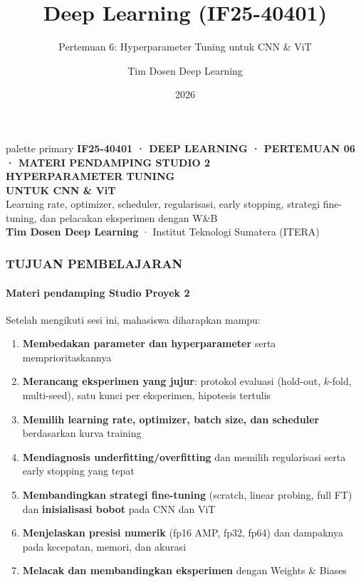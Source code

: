\documentclass[t,aspectratio=169,xcolor={dvipsnames,table}]{beamer}
\title[Pertemuan 6: Hyperparameter Tuning]{Deep Learning (IF25-40401)}
\subtitle{Pertemuan 6: Hyperparameter Tuning untuk CNN \& ViT}
\author{Tim Dosen Deep Learning}
\institute{Teknik Informatika — Institut Teknologi Sumatera (ITERA)}
\date{2026}
\begin{document}
\begin{frame}[plain]
  \begin{beamercolorbox}[wd=\paperwidth,ht=\paperheight,sep=1.5cm]{palette primary}
    \vspace{0.8cm}
    {\scriptsize\bfseries\color{dlMute}IF25-40401 · DEEP LEARNING · PERTEMUAN 06 · MATERI PENDAMPING STUDIO 2}\\[0.4cm]
    {\Huge\bfseries HYPERPARAMETER TUNING\\UNTUK CNN \& ViT}\\[0.4cm]
    {\small Learning rate, optimizer, scheduler, regularisasi, early stopping, strategi fine-tuning, dan pelacakan eksperimen dengan W\&B}\\[1.0cm]
    \vfill
    {\scriptsize\textbf{Tim Dosen Deep Learning} · Institut Teknologi Sumatera (ITERA)}
  \end{beamercolorbox}
\end{frame}

\begin{frame}[plain]
    \frametitle{TUJUAN PEMBELAJARAN}
    \framesubtitle{Materi pendamping Studio Proyek 2}

    \begin{exampleblock}{Setelah mengikuti sesi ini, mahasiswa diharapkan mampu:}
        \footnotesize
        \begin{enumerate}
            \item \textbf{Membedakan parameter dan hyperparameter} serta memprioritaskannya
            \item \textbf{Merancang eksperimen yang jujur}: protokol evaluasi (hold-out, $k$-fold, multi-seed), satu kunci per eksperimen, hipotesis tertulis
            \item \textbf{Memilih learning rate, optimizer, batch size, dan scheduler} berdasarkan kurva training
            \item \textbf{Mendiagnosis underfitting/overfitting} dan memilih regularisasi serta early stopping yang tepat
            \item \textbf{Membandingkan strategi fine-tuning} (scratch, linear probing, full FT) dan \textbf{inisialisasi bobot} pada CNN dan ViT
            \item \textbf{Menjelaskan presisi numerik} (fp16 AMP, fp32, fp64) dan dampaknya pada kecepatan, memori, dan akurasi
            \item \textbf{Melacak dan membandingkan eksperimen} dengan Weights \& Biases
        \end{enumerate}
    \end{exampleblock}
\end{frame}
\end{document}
